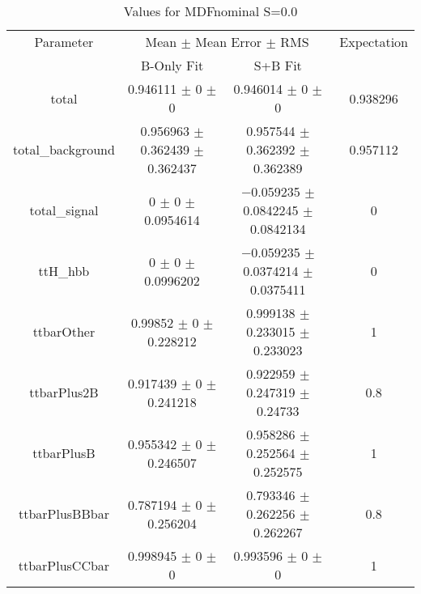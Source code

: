 \begin{table}
\centering
\caption{Values for MDFnominal S=0.0}
\begin{tabular}{cccc}
\toprule
Parameter & \multicolumn{2}{c}{Mean $\pm$ Mean Error $\pm$ RMS} & Expectation\\
 & B-Only Fit & S+B Fit & \\
\midrule
total & \num{0.946111} $\pm$ \num{0} $\pm$ \num{0} & \num{0.946014} $\pm$ \num{0} $\pm$ \num{0} & \num{0.938296}\\
total\_background & \num{0.956963} $\pm$ \num{0.362439} $\pm$ \num{0.362437} & \num{0.957544} $\pm$ \num{0.362392} $\pm$ \num{0.362389} & \num{0.957112}\\
total\_signal & \num{0} $\pm$ \num{0} $\pm$ \num{0.0954614} & \num{-0.059235} $\pm$ \num{0.0842245} $\pm$ \num{0.0842134} & \num{0}\\
ttH\_hbb & \num{0} $\pm$ \num{0} $\pm$ \num{0.0996202} & \num{-0.059235} $\pm$ \num{0.0374214} $\pm$ \num{0.0375411} & \num{0}\\
ttbarOther & \num{0.99852} $\pm$ \num{0} $\pm$ \num{0.228212} & \num{0.999138} $\pm$ \num{0.233015} $\pm$ \num{0.233023} & \num{1}\\
ttbarPlus2B & \num{0.917439} $\pm$ \num{0} $\pm$ \num{0.241218} & \num{0.922959} $\pm$ \num{0.247319} $\pm$ \num{0.24733} & \num{0.8}\\
ttbarPlusB & \num{0.955342} $\pm$ \num{0} $\pm$ \num{0.246507} & \num{0.958286} $\pm$ \num{0.252564} $\pm$ \num{0.252575} & \num{1}\\
ttbarPlusBBbar & \num{0.787194} $\pm$ \num{0} $\pm$ \num{0.256204} & \num{0.793346} $\pm$ \num{0.262256} $\pm$ \num{0.262267} & \num{0.8}\\
ttbarPlusCCbar & \num{0.998945} $\pm$ \num{0} $\pm$ \num{0} & \num{0.993596} $\pm$ \num{0} $\pm$ \num{0} & \num{1}\\
\bottomrule
\end{tabular}
\end{table}